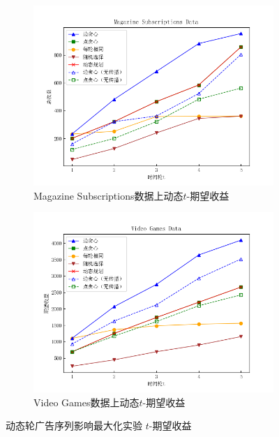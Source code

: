\begin{figure}[th]
    \begin{subfigure}{0.45\textwidth}
       \includegraphics[width=\linewidth]{figure/sasim/adp/adp_cn_magazine}
        \caption{Magazine Subscriptions数据上动态$t$-期望收益}
        \label{fig:adp3}
    \end{subfigure}
    \hfill
    \begin{subfigure}{0.45\textwidth}
        \includegraphics[width=\linewidth]{figure/sasim/nonadp/non_cn_video}
        \caption{Video Games数据上动态$t$-期望收益}
        \label{fig:adp4}
    \end{subfigure}
    \caption{动态轮广告序列影响最大化实验 $t$-期望收益}
    \label{fig:adp}
\end{figure}

